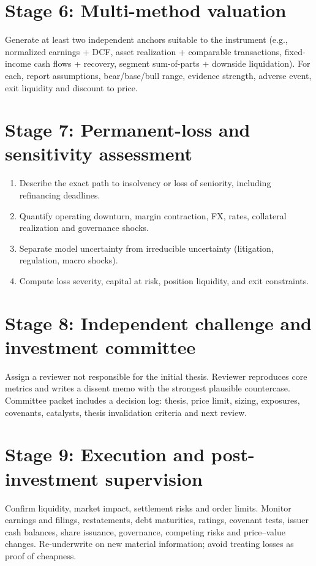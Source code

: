 \documentclass[11pt,letterpaper]{article}
\begin{document}
\section{Stage 6: Multi-method valuation}
Generate at least two independent anchors suitable to the instrument (e.g., normalized earnings + DCF, asset realization + comparable transactions, fixed-income cash flows + recovery, segment sum-of-parts + downside liquidation). For each, report assumptions, bear/base/bull range, evidence strength, adverse event, exit liquidity and discount to price.

\section{Stage 7: Permanent-loss and sensitivity assessment}
\begin{enumerate}
\item Describe the exact path to insolvency or loss of seniority, including refinancing deadlines.
\item Quantify operating downturn, margin contraction, FX, rates, collateral realization and governance shocks.
\item Separate model uncertainty from irreducible uncertainty (litigation, regulation, macro shocks).
\item Compute loss severity, capital at risk, position liquidity, and exit constraints.
\end{enumerate}

\section{Stage 8: Independent challenge and investment committee}
Assign a reviewer not responsible for the initial thesis. Reviewer reproduces core metrics and writes a dissent memo with the strongest plausible countercase. Committee packet includes a decision log: thesis, price limit, sizing, exposures, covenants, catalysts, thesis invalidation criteria and next review.

\section{Stage 9: Execution and post-investment supervision}
Confirm liquidity, market impact, settlement risks and order limits. Monitor earnings and filings, restatements, debt maturities, ratings, covenant tests, issuer cash balances, share issuance, governance, competing risks and price--value changes. Re-underwrite on new material information; avoid treating losses as proof of cheapness.
\end{document}
